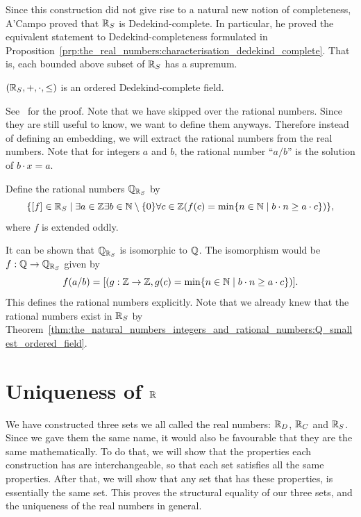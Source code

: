\documentclass[../main.tex]{subfiles}
\begin{document}
Since this construction did not give rise to a natural new notion of completeness, A'Campo proved that $\mathbb{R}_S$ is Dedekind-complete. In particular, he proved the equivalent statement to Dedekind-completeness formulated in Proposition~\ref{prp:the_real_numbers:characterisation_dedekind_complete}. That is, each bounded above subset of $\mathbb{R}_S$ has a supremum.
\begin{proposition}\label{prp:the_real_numbers:schanuel_R_dedekind_complete}
    $(\mathbb{R}_S,+,\cdot,\leq)$ is an ordered Dedekind-complete field.
\end{proposition}
See~\cite{ACampo2003} for the proof. Note that we have skipped over the rational numbers. Since they are still useful to know, we want to define them anyways. Therefore instead of defining an embedding, we will extract the rational numbers from the real numbers. Note that for integers $a$ and $b$, the rational number ``$a/b$'' is the solution of $b\cdot x=a$.
\begin{definition}
    Define the rational numbers $\mathbb{Q}_{\mathbb{R}_S}$ by
    \begin{equation*}
        \{[f]\in\mathbb{R}_S\mid\exists a\in\mathbb{Z}\exists b\in\mathbb{N}\setminus\{0\}\forall c\in\mathbb{Z}(f(c)=\min\{n\in\mathbb{N}\mid b\cdot n\geq a\cdot c\})\},
    \end{equation*}
    where $f$ is extended oddly.
\end{definition}
It can be shown that $\mathbb{Q}_{\mathbb{R}_S}$ is isomorphic to $\mathbb{Q}$. The isomorphism would be $f:\mathbb{Q}\to\mathbb{Q}_{\mathbb{R}_S}$ given by 
\begin{equation*}
    f(a/b)=[(g:\mathbb{Z}\to\mathbb{Z},g(c)=\min\{n\in\mathbb{N}\mid b\cdot n\geq a\cdot c\})].
\end{equation*}
This defines the rational numbers explicitly. Note that we already knew that the rational numbers exist in $\mathbb{R}_S$ by Theorem~\ref{thm:the_natural_numbers_integers_and_rational_numbers:Q_smallest_ordered_field}.

\section{Uniqueness of \texorpdfstring{$\mathbb{R}$}{ℝ}}\label{sec:the_real_numbers:uniqueness_of_R}
We have constructed three sets we all called the real numbers: $\mathbb{R}_D$, $\mathbb{R}_C$ and $\mathbb{R}_S$. Since we gave them the same name, it would also be favourable that they are the same mathematically. To do that, we will show that the properties each construction has are interchangeable, so that each set satisfies all the same properties. After that, we will show that any set that has these properties, is essentially the same set. This proves the structural equality of our three sets, and the uniqueness of the real numbers in general.
\end{document}
